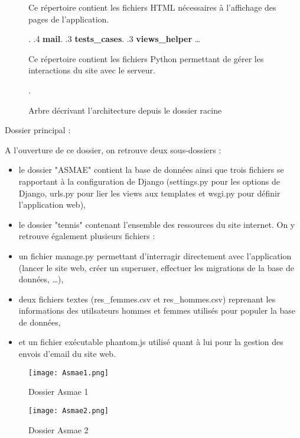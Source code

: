 \begin{figure}[!ht]
\begin{framed}
{\begin{minipage}[t]{10cm}
									Ce répertoire contient les fichiers
									HTML nécessaires à l'affichage des pages
									de l'application{.}
									\end{minipage}.
			.4 \textbf{mail}.
			.3 \textbf{tests\_cases}.
			.3 \textbf{views\_helper} \ldots{} \begin{minipage}[t]{10cm}
									Ce répertoire contient les fichiers
									Python permettant de gérer les interactions
									du site avec le serveur{.}
									\end{minipage}.
		}
	\end{framed}
	\caption{Arbre décrivant l'architecture depuis le dossier racine}
	\label{fig:Architecture des dossiers}
\end{figure}
\FloatBarrier

Dossier principal :\newline

A l'ouverture de ce dossier, on retrouve deux sous-dossiers : \newline

\begin{itemize}
	\item le dossier "ASMAE" contient  la base de données ainsi que trois fichiers se rapportant à la configuration de Django (settings.py pour les options de Django, urls.py pour lier les views aux templates et wsgi.py pour définir l'application web),
	\item le dossier "tennis" contenant l'ensemble des ressources du site internet. On y retrouve également plusieurs fichiers :
	\item un fichier manage.py permettant d'interragir directement avec l'application (lancer le site web, créer un superuser, effectuer les migrations de la base de données, …),
	\item deux fichiers textes (res\_femmes.csv et res\_hommes.csv) reprenant les informations des utilsateurs hommes et femmes utilisés pour populer la base de données,
	\item et un fichier exécutable phantom.js utilisé quant à lui pour la gestion des envois d'email du site web.
\end{itemize}

\begin{figure}[H]
\centering
\texttt{[image: Asmae1.png]}
\caption{Dossier Asmae 1}
\end{figure}
\vspace{-5cm}
\begin{figure}[H]
\centering
\texttt{[image: Asmae2.png]}
\caption{Dossier Asmae 2}
\end{figure}

